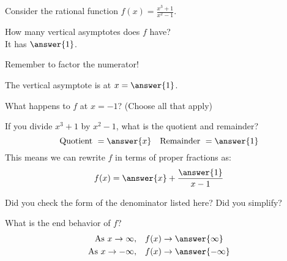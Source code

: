 \documentclass{ximera}
\author{Carl Stitz \and Jeff Zeager \and  Bobby Ramsey}
\begin{document}
Consider the rational function $\displaystyle f(x) = \frac{x^3+1}{x^2-1}$.

\begin{exercise}
	How many vertical asymptotes does $f$ have? \\
	
	It has $\answer{1}$.

	\begin{feedback}
		Remember to factor the numerator!
	\end{feedback}	
	\begin{exercise}
		The vertical asymptote is at $x = \answer{1}$.
		\begin{exercise}
			What happens to $f$ at $x=-1$? (Choose all that apply)
			\begin{selectAll}
			\end{selectAll}
		\end{exercise}	
	\end{exercise}
\end{exercise}
	
\begin{exercise}
	If you divide $x^3+1$ by $x^2-1$, what is the quotient and remainder?
	\[\text{Quotient} \,\, = \answer{x} \quad \text{Remainder} \,\, = \answer{1}\]
	This means we can rewrite $f$ in terms of proper fractions as:
	\[ f(x) = \answer{x} + \frac{\answer{1}}{x-1}  \]
	\begin{feedback}
		Did you check the form of the denominator listed here?  Did you simplify?
	\end{feedback}
	\begin{exercise}
		What is the end behavior of $f$?
		\begin{align*}
			\text{As} \,\, x \to \infty, &\quad f(x) \to \answer{\infty}\\
			\text{As} \,\, x \to -\infty, &\quad f(x) \to \answer{-\infty}\\
		\end{align*}	
	\end{exercise}	
\end{exercise}
	
\end{document}
